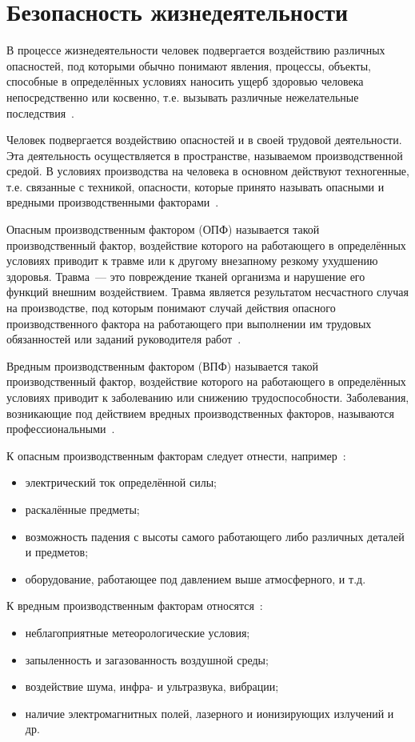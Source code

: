 \section{Безопасность жизнедеятельности}
\label{section:OSH}
В процессе жизнедеятельности человек подвергается воздействию различных опасностей, под которыми обычно понимают явления, процессы, объекты, способные в определённых условиях наносить ущерб здоровью человека непосредственно или косвенно, т.е. вызывать различные нежелательные последствия~\cite{MSTUCA_OT}.

Человек подвергается воздействию опасностей и в своей трудовой деятельности. Эта деятельность осуществляется в пространстве, называемом производственной средой. В условиях производства на человека в основном действуют техногенные, т.е. связанные с техникой, опасности, которые принято называть опасными и вредными производственными факторами~\cite{MSTUCA_OT}.

Опасным производственным фактором (ОПФ) называется такой производственный фактор, воздействие которого на работающего в определённых условиях приводит к травме или к другому внезапному резкому ухудшению здоровья. Травма~--- это повреждение тканей организма и нарушение его функций внешним воздействием. Травма является результатом несчастного случая на производстве, под которым понимают случай действия опасного производственного фактора на работающего при выполнении им трудовых обязанностей или заданий руководителя работ~\cite{MSTUCA_OT}.

Вредным производственным фактором (ВПФ) называется такой производственный фактор, воздействие которого на работающего в определённых условиях приводит к заболеванию или снижению трудоспособности. Заболевания, возникающие под действием вредных производственных факторов, называются профессиональными~\cite{MSTUCA_OT}.

К опасным производственным факторам следует отнести, например~\cite{MSTUCA_OT}:
\begin{itemize}
	\item электрический ток определённой силы;
	\item раскалённые предметы;
	\item возможность падения с высоты самого работающего либо различных деталей и
предметов;
	\item оборудование, работающее под давлением выше атмосферного, и т.д.
\end{itemize}
	
К вредным производственным факторам относятся~\cite{MSTUCA_OT}:
\begin{itemize}
	\item неблагоприятные метеорологические условия;
	\item запыленность и загазованность воздушной среды;
	\item воздействие шума, инфра- и ультразвука, вибрации; 
	\item наличие электромагнитных полей, лазерного и ионизирующих излучений и др.
\end{itemize}

